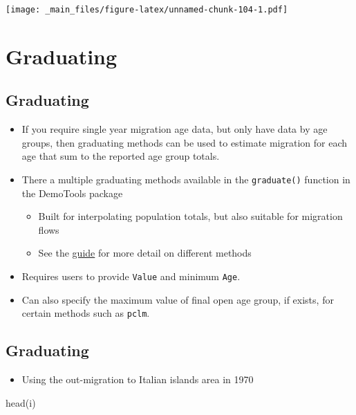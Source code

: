 \documentclass[
]{book}
\newenvironment{Shaded}{\begin{snugshade}}{\end{snugshade}}
\newcommand{\FunctionTok}[1]{\textcolor[rgb]{0.00,0.00,0.00}{#1}}
\newcommand{\NormalTok}[1]{#1}
\providecommand{\tightlist}{%
  \setlength{\itemsep}{0pt}\setlength{\parskip}{0pt}}
\begin{document}
\texttt{[image: \_main\_files/figure-latex/unnamed-chunk-104-1.pdf]}

\hypertarget{graduating}{%
\section{Graduating}\label{graduating}}

\hypertarget{graduating-1}{%
\subsection{Graduating}\label{graduating-1}}

\begin{itemize}
\tightlist
\item
  If you require single year migration age data, but only have data by age groups, then graduating methods can be used to estimate migration for each age that sum to the reported age group totals.
\item
  There a multiple graduating methods available in the \texttt{graduate()} function in the DemoTools package

  \begin{itemize}
  \tightlist
  \item
    Built for interpolating population totals, but also suitable for migration flows
  \item
    See the \href{https://timriffe.github.io/DemoTools/articles/graduation_with_demotools.html}{guide} for more detail on different methods
  \end{itemize}
\item
  Requires users to provide \texttt{Value} and minimum \texttt{Age}.
\item
  Can also specify the maximum value of final open age group, if exists, for certain methods such as \texttt{pclm}.
\end{itemize}

\hypertarget{graduating-2}{%
\subsection{Graduating}\label{graduating-2}}

\begin{itemize}
\tightlist
\item
  Using the out-migration to Italian islands area in 1970
\end{itemize}

\begin{Shaded}
\begin{Highlighting}[]
\FunctionTok{head}\NormalTok{(i)}
\end{Highlighting}
\end{Shaded}
\end{document}
